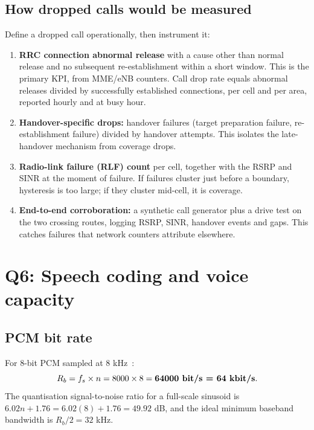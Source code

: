 \documentclass[9pt,a4paper]{extarticle}
\newcommand{\key}[1]{\textbf{#1}}
\begin{document}
\subsection{How dropped calls would be measured}
Define a dropped call operationally, then instrument it:
\begin{enumerate}[leftmargin=1.4em,itemsep=1pt,topsep=2pt]
\item \textbf{RRC connection abnormal release} with a cause other than normal release and no
subsequent re-establishment within a short window. This is the primary KPI, from MME/eNB counters. Call
drop rate equals abnormal releases divided by successfully established connections, per cell and
per area, reported hourly and at busy hour.
\item \textbf{Handover-specific drops:} handover failures (target preparation failure,
re-establishment failure) divided by handover attempts. This isolates the late-handover mechanism
from coverage drops.
\item \textbf{Radio-link failure (RLF) count} per cell, together with the RSRP and SINR at the
moment of failure. If failures cluster just before a boundary, hysteresis is too large; if they
cluster mid-cell, it is coverage.
\item \textbf{End-to-end corroboration:} a synthetic call generator plus a drive test on the two
crossing routes, logging RSRP, SINR, handover events and gaps. This catches failures that network
counters attribute elsewhere.
\end{enumerate}

\section{Q6: Speech coding and voice capacity}
\label{sec:q6}

\subsection{PCM bit rate}
For 8-bit PCM sampled at 8 kHz~\cite{g711}:
\[
R_b = f_s\times n = 8000\times8 = \key{64000\ \text{bit/s} = 64\ \text{kbit/s}}.
\]
The quantisation signal-to-noise ratio for a full-scale sinusoid is
$6.02n+1.76 = 6.02(8)+1.76 = 49.92$ dB, and the ideal minimum baseband bandwidth is
$R_b/2 = 32$ kHz.
\end{document}
